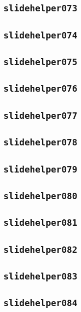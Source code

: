 \subsection{\texttt{slidehelper073}}
\newpage
\subsection{\texttt{slidehelper074}}
\newpage
\subsection{\texttt{slidehelper075}}
\newpage
\subsection{\texttt{slidehelper076}}
\newpage
\subsection{\texttt{slidehelper077}}
\newpage
\subsection{\texttt{slidehelper078}}
\newpage
\subsection{\texttt{slidehelper079}}
\newpage
\subsection{\texttt{slidehelper080}}
\newpage
\subsection{\texttt{slidehelper081}}
\newpage
\subsection{\texttt{slidehelper082}}
\newpage
\subsection{\texttt{slidehelper083}}
\newpage
\subsection{\texttt{slidehelper084}}
\newpage
